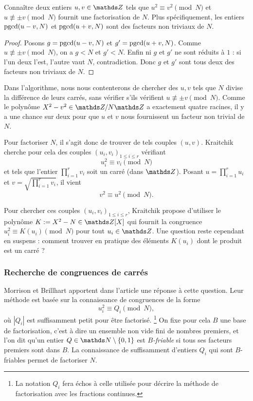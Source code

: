 \begin{lemme}
	Connaître deux entiers $u, v \in \Z$ tels que $u^2 \equiv v^2 
	\pmod{N}$ et $u\not\equiv \pm v\pmod{N}$ fournit une factorisation de $N$.
	Plus spécifiquement, les entiers $\operatorname{pgcd}(u-v, N)$ et $\operatorname{pgcd}(u+v, N)$ sont
	des facteurs non triviaux de $N$.
\end{lemme}

\begin{proof}
	Posons $g =\operatorname{pgcd}(u-v, N)$ et $g' = \operatorname{pgcd}(u+v, N)$. Comme $u\not\equiv \pm
	v\pmod{N}$, on a $g<N$ et $g'<N$. Enfin ni $g$ et $g'$ ne sont réduits à
	$1$ : si l'un deux l'est, l'autre vaut $N$, contradiction. Donc $g$ et $g'$
	sont tous deux des facteurs non triviaux de $N$.
\end{proof}

\begin{remarque}
	Dans l'algorithme, nous nous contenterons de chercher des $u, v$ tels que
	$N$ divise la différence de leurs carrés, sans vérifier s'ils vérifient $u
	\not\equiv \pm v\pmod{N}$. Comme le polynôme $X^2 - v^2 \in \Z/N\Z$ a
    exactement quatre racines, il y a \og{} une chance sur deux \fg{}  pour que
	$u$ et $v$ nous fournissent un facteur non trivial de $N$. \\
\end{remarque}

Pour factoriser $N$, il s'agit donc de trouver de tels couples $(u, v)$.
Kraitchik cherche pour cela des couples $(u_i, v_i)_{1\leq i \leq r}$ vérifiant
\[u_i^2 \equiv v_i \pmod{N}\] et tels que l'entier $\prod_{i=1}^r v_i$ soit un
carré (dans $\Z$). Posant $u = \prod_{i=1}^r u_i$ et $v = \sqrt{\prod_{i=1}^r
v_i}$, il vient \[v^2\equiv u^2 \pmod{N}.\] 

Pour chercher ces couples $(u_i, v_i)_{1\leq i \leq r}$, Kraitchik propose 
d'utiliser le polynôme  $K := X^2 - N \in \Z[X]$ qui fournit la congruence 
$u_i^2 \equiv K(u_i) \pmod{N}$ pour tout $u_i\in \Z$. Une question reste
cependant en suspens : comment trouver en pratique des éléments $K(u_i)$ 
dont le produit est un carré ?

\subsubsection{Recherche de congruences de carrés}

Morrison et Brillhart apportent dans l'article  une réponse à cette
question. Leur méthode est basée sur la connaissance de congruences de la forme
\[u_i^2 \equiv Q_i \pmod{N},\] où $| Q_i |$ est suffisamment petit pour être 
factorisé. \footnote{La notation $Q_i$ fera échos à celle utilisée pour décrire
la méthode de factorisation avec les fractions continues.} 
On fixe pour cela $B$ une base de factorisation, c'est à dire un ensemble non 
vide fini de nombres premiers, et l'on dit qu'un entier $Q\in \N\setminus
\{0, 1\}$ est \emph{$B$-friable} si tous ses facteurs premiers sont dans $B$.
La connaissance de suffisamment d'entiers $Q_i$ qui sont $B$-friables permet
de factoriser $N$.

